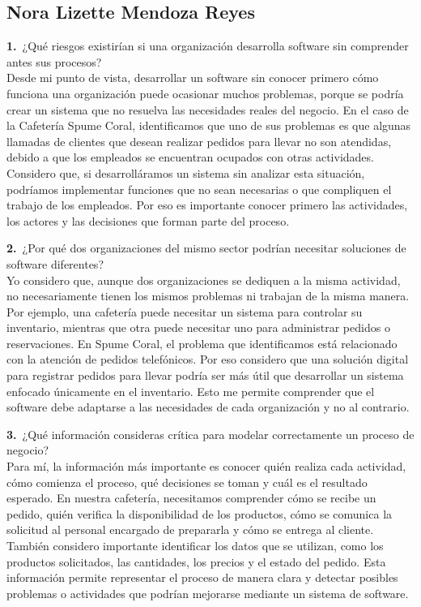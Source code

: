 \documentclass[12pt,letterpaper]{article}
\newcommand{\negr}[1]{\textsf{\bfseries\color{verde} #1}}
\begin{document}
\subsection{Nora Lizette Mendoza Reyes}
\noindent\negr{1.}\ ¿Qué riesgos existirían si una organización desarrolla software sin comprender antes sus procesos?\\
Desde mi punto de vista, desarrollar un software sin conocer primero cómo funciona una organización puede ocasionar muchos problemas, porque se podría crear un sistema que no resuelva las necesidades reales del negocio. En el caso de la Cafetería Spume Coral, identificamos que uno de sus problemas es que algunas llamadas de clientes que desean realizar pedidos para llevar no son atendidas, debido a que los empleados se encuentran ocupados con otras actividades. Considero que, si desarrolláramos un sistema sin analizar esta situación, podríamos implementar funciones que no sean necesarias o que compliquen el trabajo de los empleados. Por eso es importante conocer primero las actividades, los actores y las decisiones que forman parte del proceso.

\vspace{0.4cm}
\noindent\negr{2.}\ ¿Por qué dos organizaciones del mismo sector podrían necesitar soluciones de software diferentes?\\
Yo considero que, aunque dos organizaciones se dediquen a la misma actividad, no necesariamente tienen los mismos problemas ni trabajan de la misma manera. Por ejemplo, una cafetería puede necesitar un sistema para controlar su inventario, mientras que otra puede necesitar uno para administrar pedidos o reservaciones. En Spume Coral, el problema que identificamos está relacionado con la atención de pedidos telefónicos. Por eso considero que una solución digital para registrar pedidos para llevar podría ser más útil que desarrollar un sistema enfocado únicamente en el inventario. Esto me permite comprender que el software debe adaptarse a las necesidades de cada organización y no al contrario.

\vspace{0.4cm}
\noindent\negr{3.}\ ¿Qué información consideras crítica para modelar correctamente un proceso de negocio?\\
Para mí, la información más importante es conocer quién realiza cada actividad, cómo comienza el proceso, qué decisiones se toman y cuál es el resultado esperado. En nuestra cafetería, necesitamos comprender cómo se recibe un pedido, quién verifica la disponibilidad de los productos, cómo se comunica la solicitud al personal encargado de prepararla y cómo se entrega al cliente. También considero importante identificar los datos que se utilizan, como los productos solicitados, las cantidades, los precios y el estado del pedido. Esta información permite representar el proceso de manera clara y detectar posibles problemas o actividades que podrían mejorarse mediante un sistema de software.
\end{document}

